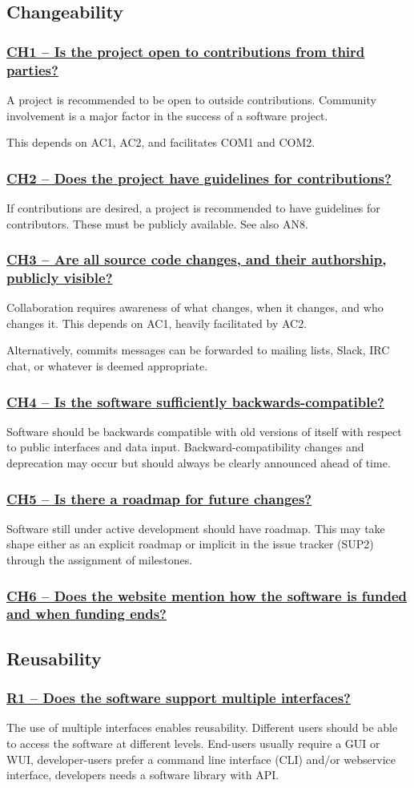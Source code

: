 \documentclass[a4paper,11pt]{article}
\newcommand{\indicator}[1]{\subsubsection*{\underline{#1}}}
\begin{document}
\subsection{Changeability}

\indicator{CH1 -- Is the project open to contributions from third parties?}

A project is recommended to be open to outside contributions. Community
involvement is a major factor in the success of a software project. 

This depends on AC1, AC2, and facilitates COM1 and COM2. 

\indicator{CH2 -- Does the project have guidelines for contributions?}

If contributions are desired, a project is recommended to have guidelines for
contributors. These must be publicly available.
See also AN8.

\indicator{CH3 -- Are all source code changes, and their authorship, publicly visible?} 

Collaboration requires awareness of what changes, when it changes, and who
changes it. This depends on AC1, heavily facilitated by AC2.

Alternatively, commits messages can be forwarded to mailing lists, Slack, IRC chat, or
whatever is deemed appropriate.

\indicator{CH4 -- Is the software sufficiently backwards-compatible?}

Software should be backwards compatible with old versions of itself with respect
to public interfaces and data input. Backward-compatibility changes and
deprecation may occur but should always be clearly announced ahead of time.

\indicator{CH5 -- Is there a roadmap for future changes?}

Software still under active development should have roadmap. This may take
shape either as an explicit roadmap or implicit in the issue tracker
(SUP2) through the assignment of milestones.

\indicator{CH6 -- Does the website mention how the software is funded and
when funding ends?}

\subsection{Reusability}

\indicator{R1 -- Does the software support multiple interfaces?}

The use of multiple interfaces enables reusability. Different users should be
able to access the software at different levels. End-users usually require a
GUI or WUI, developer-users prefer a command line interface (CLI) and/or
webservice interface, developers needs a software library with API.
\end{document}
